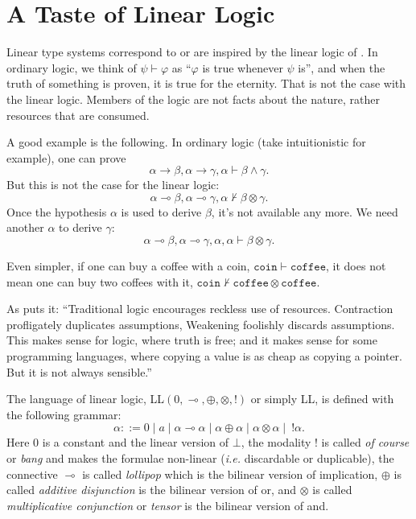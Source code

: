 \section{A Taste of Linear Logic}

Linear type systems correspond to or are inspired by the linear logic of \cite{DBLP:journals/tcs/Girard87}. In ordinary logic, we think of $\psi \vdash \varphi$ as ``$\varphi$ is true whenever $\psi$ is'', and when the truth of something is proven, it is true for the eternity. That is not the case with the linear logic. Members of the logic are not facts about the nature, rather resources that are consumed.

A good example is the following. In ordinary logic (take intuitionistic for example), one can prove
\[
\alpha \rightarrow \beta, \alpha \rightarrow \gamma, \alpha \vdash \beta \wedge \gamma.
\]
But this is not the case for the linear logic:
\[
\alpha \multimap \beta, \alpha \multimap \gamma, \alpha \not\vdash \beta \otimes \gamma.
\]
Once the hypothesis $\alpha$ is used to derive $\beta$, it's not available any more. We need another $\alpha$ to derive $\gamma$:
\[
\alpha \multimap \beta, \alpha \multimap \gamma, \alpha, \alpha \vdash \beta \otimes \gamma.
\]

Even simpler, if one can buy a coffee with a coin, $\mathtt{coin} \vdash \mathtt{coffee}$, it does not mean one can buy two coffees with it, $\mathtt{coin} \not\vdash \mathtt{coffee} \otimes \mathtt{coffee}$.

As \cite{DBLP:conf/mfcs/Wadler93} puts it: ``Traditional logic encourages reckless use of resources. Contraction profligately duplicates assumptions, Weakening foolishly discards assumptions. This makes sense for logic, where truth is free; and it makes sense for some programming languages, where copying a value is as cheap as copying a pointer. But it is not always sensible.''

The language of linear logic, LL$(0, \multimap, \oplus, \otimes, !)$ or simply LL, is defined with the following grammar:
\[
\alpha ::= 0 \mid a \mid \alpha \multimap \alpha \mid \alpha \oplus \alpha \mid \alpha \otimes \alpha \mid~ !\alpha.
\]
Here $0$ is a constant and the linear version of $\bot$, the modality $!$ is called \textit{of course} or \textit{bang} and makes the formulae non-linear (\textit{i.e.} discardable or duplicable), the connective $\multimap$ is called \textit{lollipop} which is the bilinear version of implication, $\oplus$ is called \textit{additive disjunction} is the bilinear version of or, and $\otimes$ is called \textit{multiplicative conjunction} or \textit{tensor} is the bilinear version of and.

